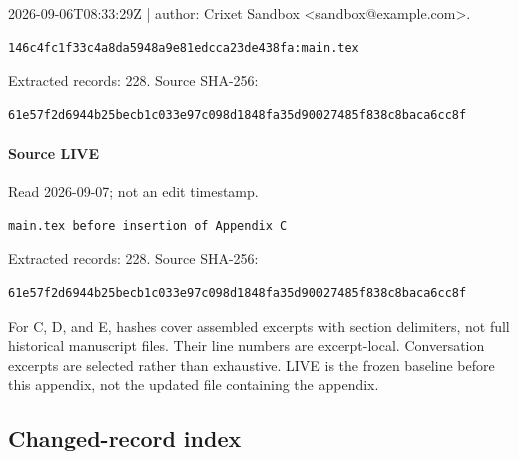 \documentclass[11pt]{article}
\begin{document}
2026-09-06T08:33:29Z | author: Crixet Sandbox <sandbox@example.com>.

\begin{lstlisting}
146c4fc1f33c4a8da5948a9e81edcca23de438fa:main.tex
\end{lstlisting}

Extracted records: 228. Source SHA-256:

\begin{lstlisting}
61e57f2d6944b25becb1c033e97c098d1848fa35d90027485f838c8baca6cc8f
\end{lstlisting}

\paragraph{Source LIVE}

Read 2026-09-07; not an edit timestamp.

\begin{lstlisting}
main.tex before insertion of Appendix C
\end{lstlisting}

Extracted records: 228. Source SHA-256:

\begin{lstlisting}
61e57f2d6944b25becb1c033e97c098d1848fa35d90027485f838c8baca6cc8f
\end{lstlisting}

For C, D, and E, hashes cover assembled excerpts with section delimiters, not full historical manuscript files. Their line numbers are excerpt-local. Conversation excerpts are selected rather than exhaustive. LIVE is the frozen baseline before this appendix, not the updated file containing the appendix.

\subsection{Changed-record index}
\end{document}
